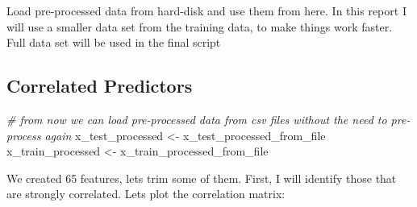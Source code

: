 \documentclass[]{article}
\newenvironment{Shaded}{\begin{snugshade}}{\end{snugshade}}
\newcommand{\CommentTok}[1]{\textcolor[rgb]{0.56,0.35,0.01}{\textit{#1}}}
\newcommand{\DataTypeTok}[1]{\textcolor[rgb]{0.13,0.29,0.53}{#1}}
\newcommand{\DecValTok}[1]{\textcolor[rgb]{0.00,0.00,0.81}{#1}}
\newcommand{\KeywordTok}[1]{\textcolor[rgb]{0.13,0.29,0.53}{\textbf{#1}}}
\newcommand{\NormalTok}[1]{#1}
\newcommand{\OperatorTok}[1]{\textcolor[rgb]{0.81,0.36,0.00}{\textbf{#1}}}
\newcommand{\StringTok}[1]{\textcolor[rgb]{0.31,0.60,0.02}{#1}}
\begin{document}
Load pre-processed data from hard-disk and use them from here. In this
report I will use a smaller data set from the training data, to make
things work faster. Full data set will be used in the final script

\begin{Shaded}
\end{Shaded}

\hypertarget{correlated-predictors}{%
\subsection{Correlated Predictors}\label{correlated-predictors}}

\begin{Shaded}
\begin{Highlighting}[]
\CommentTok{# from now we can load pre-processed data from csv files without the need to pre-process again}
\NormalTok{x_test_processed <-}\StringTok{ }\NormalTok{x_test_processed_from_file}
\NormalTok{x_train_processed <-}\StringTok{ }\NormalTok{x_train_processed_from_file }
\end{Highlighting}
\end{Shaded}

We created 65 features, lets trim some of them. First, I will identify
those that are strongly correlated. Lets plot the correlation matrix:
\end{document}
